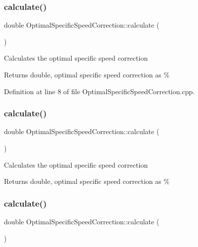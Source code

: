 \subsubsection{\texorpdfstring{calculate()}{calculate()}\hspace{0.1cm}{\footnotesize\ttfamily [1/3]}}
{\footnotesize\ttfamily double Optimal\+Specific\+Speed\+Correction\+::calculate (\begin{DoxyParamCaption}{ }\end{DoxyParamCaption})}

Calculates the optimal specific speed correction

\begin{DoxyReturn}{Returns}
double, optimal specific speed correction as \% 
\end{DoxyReturn}


Definition at line 8 of file Optimal\+Specific\+Speed\+Correction.\+cpp.

\mbox{\label{class_optimal_specific_speed_correction_a3337ebde4e64c20f19adbda6204fa0be}} 
\subsubsection{\texorpdfstring{calculate()}{calculate()}\hspace{0.1cm}{\footnotesize\ttfamily [2/3]}}
{\footnotesize\ttfamily double Optimal\+Specific\+Speed\+Correction\+::calculate (\begin{DoxyParamCaption}{ }\end{DoxyParamCaption})}

Calculates the optimal specific speed correction

\begin{DoxyReturn}{Returns}
double, optimal specific speed correction as \% 
\end{DoxyReturn}
\mbox{\label{class_optimal_specific_speed_correction_a3337ebde4e64c20f19adbda6204fa0be}} 
\subsubsection{\texorpdfstring{calculate()}{calculate()}\hspace{0.1cm}{\footnotesize\ttfamily [3/3]}}
{\footnotesize\ttfamily double Optimal\+Specific\+Speed\+Correction\+::calculate (\begin{DoxyParamCaption}{ }\end{DoxyParamCaption})}

